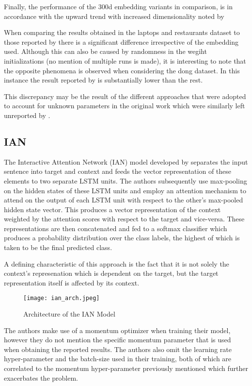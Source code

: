 \documentclass[../../fyp.tex]{subfiles}
\begin{document}
Finally, the performance of the 300d embedding variants in comparison, is in accordance with the upward trend with increased dimensionality noted by \citet{moore2018}

When comparing the results obtained in the laptops and restaurants dataset to those reported by \citet{chen2017} there is a significant difference irrespective of the embedding used. Although this can also be caused by randomness in the wegiht initializations (no mention of multiple runs is made), it is interesting to note that the opposite phenomena is observed when considering the dong dataset. In this instance the result reported by \cite{chen2017} is substantially lower than the rest.

This discrepancy may be the result of the different approaches that were adopted to account for unknown parameters in the original work \cite{tang2016b} which were similarly left unreported by \cite{chen2017}.

\subsection{IAN}

The Interactive Attention Network (IAN) model developed by \citet{dehongma2017} separates the input sentence into target and context and feeds the vector representation of these elements to two separate LSTM units. The authors subsequently use max-pooling on the hidden states of these LSTM units and employ an attention mechanism to attend on the output of each LSTM unit with respect to the other's max-pooled hidden state vector. This produces a vector representation of the context weighted by the attention scores with respect to the target and vice-versa. These representations are then concatenated and fed to a softmax classifier which produces a probability distribution over the class labels, the highest of which is taken to be the final predicted class. 

A defining characteristic of this approach is the fact that it is not solely the context's represenation which is dependent on the target, but the target representation itself is affected by its context. 

\begin{figure}[!ht]
	\centering
	\texttt{[image: ian\_arch.jpeg]}
	\caption{Architecture of the IAN Model \cite{dehongma2017}}
	\label{fig:ian_arch}
\end{figure}

The authors make use of a momentum optimizer when training their model, however they do not mention the specific momentum parameter that is used when obtaining the reported results. The authors also omit the learning rate hyper-parameter and the batch-size used in their training, both of which are correlated to the momentum hyper-parameter previously mentioned which further exacerbates the problem. 
\end{document}

